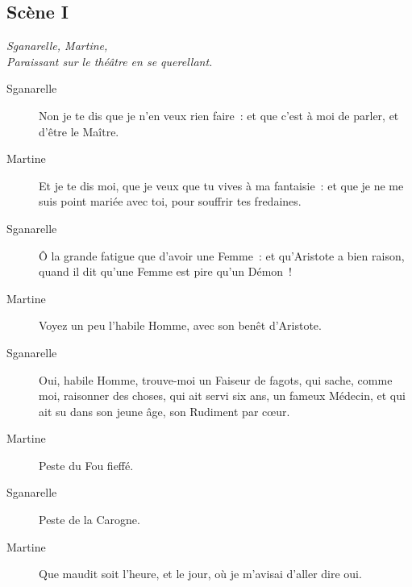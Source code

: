 \documentclass[french,twoside]{book} %
\begin{document}
\subsection[{Scène I}]{Scène I}
\label{I01}
\textit{Sganarelle, Martine, \\
Paraissant sur le théâtre en se querellant.}\par
 \begin{description} \item[Sganarelle] 

Non je te dis que je n’en veux rien faire : et que c’est à moi de parler, et d’être le Maître.\end{description}
 \begin{description} \item[Martine] 

Et je te dis moi, que je veux que tu vives à ma fantaisie : et que je ne me suis point mariée avec toi, pour souffrir tes fredaines.\end{description}
 \begin{description} \item[Sganarelle] 

Ô la grande fatigue que d’avoir une Femme : et qu’Aristote a bien raison, quand il dit qu’une Femme est pire qu’un Démon !\end{description}
 \begin{description} \item[Martine] 

Voyez un peu l’habile Homme, avec son benêt d’Aristote.\end{description}
 \begin{description} \item[Sganarelle] 

Oui, habile Homme, trouve-moi un Faiseur de fagots, qui sache, comme moi, raisonner des choses, qui ait servi six ans, un fameux Médecin, et qui ait su dans son jeune âge, son Rudiment par cœur.\end{description}
 \begin{description} \item[Martine] 

Peste du Fou fieffé.\end{description}
 \begin{description} \item[Sganarelle] 

Peste de la Carogne.\end{description}
 \begin{description} \item[Martine] 

Que maudit soit l’heure, et le jour, où je m’avisai d’aller dire oui.\end{description}
\end{document}
